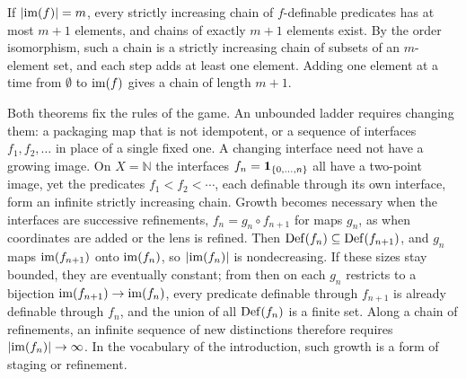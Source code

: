 \begin{remark}\label{rem:chain_length}
If $|\mathrm{im}(f)|=m$, every strictly increasing chain of $f$-definable predicates has at most $m+1$ elements, and chains of exactly $m+1$ elements exist.
By the order isomorphism, such a chain is a strictly increasing chain of subsets of an $m$-element set, and each step adds at least one element.
Adding one element at a time from $\emptyset$ to $\mathrm{im}(f)$ gives a chain of length $m+1$.
\end{remark}

\begin{remark}\label{rem:ladders_continue}
Both theorems fix the rules of the game.
An unbounded ladder requires changing them: a packaging map that is not idempotent, or a sequence of interfaces $f_1,f_2,\dots$ in place of a single fixed one.
A changing interface need not have a growing image.
On $X=\mathbb{N}$ the interfaces $f_n=\mathbf{1}_{\{0,\dots,n\}}$ all have a two-point image, yet the predicates $f_1<f_2<\cdots$, each definable through its own interface, form an infinite strictly increasing chain.
Growth becomes necessary when the interfaces are successive refinements, $f_n=g_n\circ f_{n+1}$ for maps $g_n$, as when coordinates are added or the lens is refined.
Then $\mathrm{Def}(f_n)\subseteq\mathrm{Def}(f_{n+1})$, and $g_n$ maps $\mathrm{im}(f_{n+1})$ onto $\mathrm{im}(f_n)$, so $|\mathrm{im}(f_n)|$ is nondecreasing.
If these sizes stay bounded, they are eventually constant; from then on each $g_n$ restricts to a bijection $\mathrm{im}(f_{n+1})\to\mathrm{im}(f_n)$, every predicate definable through $f_{n+1}$ is already definable through $f_n$, and the union of all $\mathrm{Def}(f_n)$ is a finite set.
Along a chain of refinements, an infinite sequence of new distinctions therefore requires $|\mathrm{im}(f_n)|\to\infty$.
In the vocabulary of the introduction, such growth is a form of staging or refinement.
\end{remark}

